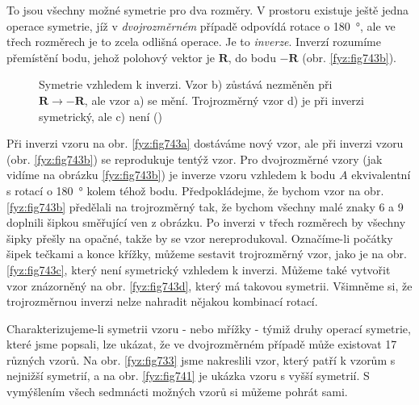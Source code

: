     To jsou všechny možné symetrie pro dva rozměry. V prostoru existuje ještě jedna operace 
    symetrie, jíž v \emph{dvojrozměrném} případě odpovídá rotace o \SI{180}{\degree}, ale ve třech 
    rozměrech je to zcela odlišná operace. Je to \emph{inverze}. Inverzí rozumíme přemístění bodu, 
    jehož polohový vektor je \(\bm{R}\), do bodu \(\bm{-R}\) (obr. \ref{fyz:fig743b}). 

    \begin{figure}[ht!]   %
      \centering
                    \newline
      \caption{Symetrie vzhledem k inverzi. Vzor b) zůstává nezměněn při \(\bm{R} \rightarrow 
               \bm{-R}\), ale vzor a) se mění. Trojrozměrný vzor d) je při inverzi symetrický, ale 
               c) není
               (\cite[s.~551]{Feynman02})}
      \label{fyz:fig743}
    \end{figure}

    Při inverzi vzoru na obr. \ref{fyz:fig743a} dostáváme nový vzor, ale při inverzi vzoru (obr. 
    \ref{fyz:fig743b}) se reprodukuje tentýž vzor. Pro dvojrozměrné vzory (jak vidíme na obrázku 
    \ref{fyz:fig743b}) je inverze vzoru vzhledem k bodu \(A\) ekvivalentní s rotací o 
    \SI{180}{\degree} kolem téhož bodu. Předpokládejme, že bychom vzor na obr. \ref{fyz:fig743b} 
    předělali na trojrozměrný tak, že bychom všechny malé znaky \num{6} a \num{9} doplnili šipkou 
    směřující ven z obrázku. Po inverzi v třech rozměrech by všechny šipky přešly na opačné, takže 
    by se vzor nereprodukoval. Označíme-li počátky šipek tečkami a konce křížky, můžeme sestavit 
    trojrozměrný vzor, jako je na obr. \ref{fyz:fig743c}, který není symetrický vzhledem k inverzi. 
    Můžeme také vytvořit vzor znázorněný na obr. \ref{fyz:fig743d}, který má takovou symetrii. 
    Všimněme si, že trojrozměrnou inverzi nelze nahradit nějakou kombinací rotací.

    Charakterizujeme-li symetrii vzoru - nebo mřížky - týmiž druhy operací symetrie, které jsme 
    popsali, lze ukázat, že ve dvojrozměrném případě může existovat \num{17} různých vzorů. Na obr. 
    \ref{fyz:fig733} jsme nakreslili vzor, který patří k vzorům s nejnižší symetrií, a na obr. 
    \ref{fyz:fig741} je ukázka vzoru s vyšší symetrií. S vymýšlením všech sedmnácti možných vzorů 
    si můžeme pohrát sami.
    
